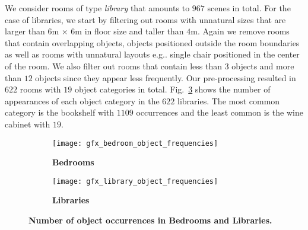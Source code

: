 \documentclass{article}
\makeatletter
\DeclareRobustCommand\onedot{\futurelet\@let@token\@onedot}
\def\@onedot{\ifx\@let@token.\else.\null\fi\xspace}
\def\eg{e.g\onedot} \def\Eg{E.g\onedot}
\newcommand{\boldparagraph}[1]{\vspace{0.2cm}\noindent{\bf #1:} }
\newcommand{\figref}[1]{Fig.~\ref{#1}}
\makeatother
\begin{document}
\boldparagraph{Library}We consider rooms of type \emph{library} that amounts to $967$ scenes in total.
For the case of libraries, we start by filtering out rooms with unnatural sizes
that are larger than $6$m $\times$ $6$m in floor size and taller than $4$m.
Again we remove rooms that contain overlapping objects, objects positioned
outside the room boundaries as well as rooms with unnatural layouts \eg
single chair positioned in the center of the room. We also filter out rooms
that contain less than $3$ objects and more than $12$ objects since they appear
less frequently. Our pre-processing resulted in $622$ rooms with $19$ object categories 
in total. \figref{fig:library_object_frequencies} shows the number of
appearances of each object category in the $622$ libraries. The most common
category is the bookshelf with $1109$ occurrences and the least common is the
wine cabinet with $19$.
\begin{figure}[h!]
    \begin{subfigure}[t]{0.5\textwidth}
        \centering
        \texttt{[image: gfx\_bedroom\_object\_frequencies]}
        \vspace{-1.2em}
        \caption{{\bf{Bedrooms}}}
        \label{fig:bedroom_object_frequencies}
    \end{subfigure}\begin{subfigure}[t]{0.5\textwidth}
        \centering
        \texttt{[image: gfx\_library\_object\_frequencies]}
        \vspace{-1.2em}
        \caption{{\bf{Libraries}}}
        \label{fig:library_object_frequencies}
    \end{subfigure}
    \caption{\bf{Number of object occurrences in Bedrooms and Libraries.}}
    \vspace{-1.2em}
\end{figure}
\end{document}
